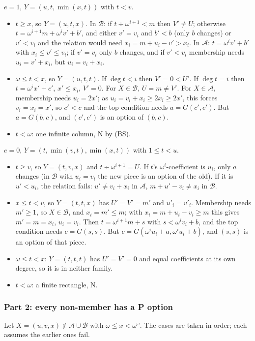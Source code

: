 \documentclass[11pt]{amsart}
\theoremstyle{definition}
\theoremstyle{remark}
\newcommand{\A}{\mathcal{A}}
\newcommand{\B}{\mathcal{B}}
\newcommand{\G}{G}
\begin{document}
\emph{$e=1$}, $Y=(u,t,\min(x,t))$ with $t<v$.
\begin{itemize}
\item $t\ge x$, so $Y=(u,t,x)$. In $\B$: if $t\div\omega^{i+1}<m$ then $V'\ne U$; otherwise
  $t=\omega^{i+1}m+\omega^iv'+b'$, and either $v'=v_i$ and $b'<b$ (only $b$ changes) or $v'<v_i$
  and the relation would need $x_i=m+u_i-v'>x_i$. In $\A$: $t=\omega^iv'+b'$ with
  $x_i\le v'\le v_i$; if $v'=v_i$ only $b$ changes, and if $v'<v_i$ membership needs
  $u_i=v'+x_i$, but $u_i=v_i+x_i$.
\item $\omega\le t<x$, so $Y=(u,t,t)$. If $\deg t<i$ then $V'=0<U'$. If $\deg t=i$ then
  $t=\omega^ix'+c'$, $x'\le x_i$, $V'=0$. For $X\in\B$, $U=m\ne V'$. For $X\in\A$, membership needs
  $u_i=2x'$; as $u_i=v_i+x_i\ge2x_i\ge2x'$, this forces $v_i=x_i=x'$, so $c'<c$ and the top
  condition needs $a=\G(c',c')$. But $a=\G(b,c)$, and $(c',c')$ is an option of $(b,c)$.
\item $t<\omega$: one infinite column, N by (BS).
\end{itemize}

\emph{$e=0$}, $Y=(t,\min(v,t),\min(x,t))$ with $1\le t<u$.
\begin{itemize}
\item $t\ge v$, so $Y=(t,v,x)$ and $t\div\omega^{i+1}=U$. If $t$'s $\omega^i$-coefficient is
  $u_i$, only $a$ changes (in $\B$ with $u_i=v_i$ the new piece is an option of the old). If it
  is $u'<u_i$, the relation fails: $u'\ne v_i+x_i$ in $\A$, $m+u'-v_i\ne x_i$ in $\B$.
\item $x\le t<v$, so $Y=(t,t,x)$ has $U'=V'=m'$ and $u'_i=v'_i$. Membership needs $m'\ge1$, so
  $X\in\B$, and $x_i=m'\le m$; with $x_i=m+u_i-v_i\ge m$ this gives $m'=m=x_i$, $u_i=v_i$. Then
  $t=\omega^{i+1}m+s$ with $s<\omega^iv_i+b$, and the top condition needs $c=\G(s,s)$. But
  $c=\G(\omega^iu_i+a,\omega^iu_i+b)$, and $(s,s)$ is an option of that piece.
\item $\omega\le t<x$: $Y=(t,t,t)$ has $U'=V'=0$ and equal coefficients at its own degree, so
  it is in neither family.
\item $t<\omega$: a finite rectangle, N.
\end{itemize}

\subsubsection*{Part 2: every non-member has a P option}
Let $X=(u,v,x)\notin\A\cup\B$ with $\omega\le x<\omega^\omega$. The cases are taken in order;
each assumes the earlier ones fail.
\end{document}
